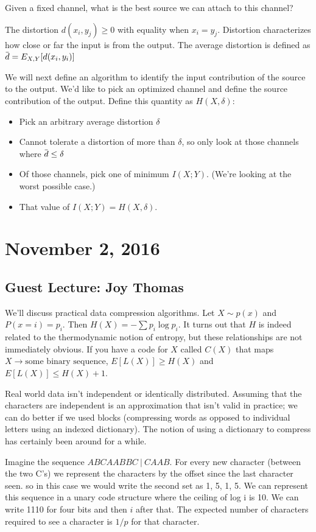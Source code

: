 \documentclass[11pt]{article}
\newcommand{\overbar}[1]{\mkern 1.5mu\overline{\mkern-1.5mu#1\mkern-1.5mu}\mkern 1.5mu}
\theoremstyle{definition}
\newcommand{\xhdr}[1]{\vspace{2mm}\noindent{{\bf #1.}}}
\begin{document}
Given a fixed channel, what is the best source we can attach to this channel? 

 The distortion $d(x_i, y_j) \geq 0$ with equality when $x_i = y_j$. Distortion characterizes how close or far the input is from the output. The average distortion is defined as $\overbar{d} = E_{X,Y}[d(x_i, y_i)]$

We will next define an algorithm to identify the input contribution of the source to the output. 
 We'd like to pick an optimized channel and define the source contribution of the output. Define this quantity as $H(X, \delta)$: 
\begin{itemize}
\item Pick an arbitrary average distortion $\delta$
\item Cannot tolerate a distortion of more than $\delta$, so only look at those channels where $\overbar{d} \leq \delta$
\item Of those channels, pick one of minimum $I(X;Y)$. (We're looking at the worst possible case.) 
\item That value of $I(X;Y) = H(X,\delta)$. 
\end{itemize}

\section{November 2, 2016}

\subsection{Guest Lecture: Joy Thomas}
We'll discuss practical data compression algorithms. Let $X \sim p(x)$ and $P(x = i) = p_i$. Then $H(X) = -\sum p_i \log p_i$. It turns out that $H$ is indeed related to the thermodynamic notion of entropy, but these relationships are not immediately obvious. If you have a code for $X$ called $C(X)$ that maps $X \rightarrow \text{some binary sequence}$, $E[L(X)] \geq H(X)$ and $E[L(X)] \leq H(X) + 1$. 

Real world data isn't independent or identically distributed. Assuming that the characters are independent is an approximation that isn't valid in practice; we can do better if we used blocks (compressing words as opposed to individual letters using an indexed dictionary). The notion of using a dictionary to compress has certainly been around for a while. 

\xhdr{Backwards Lookahead} Imagine the sequence $ABCAABBC \: | \: CAAB$. For every new character (between the two C's) we represent the characters by the offset since the last character seen. so in this case we would write the second set as 1, 5, 1, 5. We can represent this sequence in a unary code structure where the ceiling of log i  is 10. We can write 1110 for four bits  and then $i$ after that. The expected number of characters required to see a character is $1/p$ for that character. 
\end{document}
